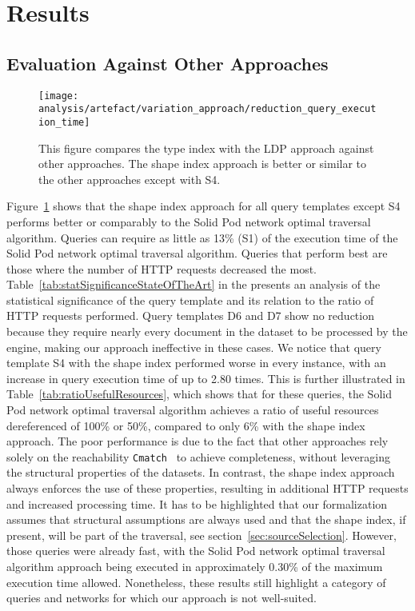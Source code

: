 \section{Results}

\subsection{Evaluation Against Other Approaches}

\begin{figure}[h]
    \centering
    \texttt{[image: analysis/artefact/variation\_approach/reduction\_query\_execution\_time]}
    \caption{
        This figure compares the type index with the LDP approach against other approaches.
        The shape index approach is better or similar to the other approaches except with S4.
    }
    \label{fig:compApproach}
\end{figure}


Figure~\ref{fig:compApproach} shows that the shape index approach for all query templates except S4 performs better or comparably to the Solid Pod network optimal traversal algorithm.
Queries can require as little as 13\% (S1) of the execution time of the Solid Pod network optimal traversal algorithm.
Queries that perform best are those where the number of HTTP requests decreased the most.
Table~\ref{tab:statSignificanceStateOfTheArt} in the  presents an analysis of the statistical significance of the query template and its relation to the ratio of HTTP requests performed.
Query templates D6 and D7 show no reduction because they require nearly every document in the dataset to be processed by the engine, making our approach ineffective in these cases.
We notice that query template S4 with the shape index performed worse in every instance, with an increase in query execution time of up to 2.80 times.
This is further illustrated in Table~\ref{tab:ratioUsefulResources}, which shows that for these queries, the Solid Pod network optimal traversal algorithm achieves a ratio of useful resources dereferenced of 100\% or 50\%, compared to only 6\% with the shape index approach.
The poor performance is due to the fact that other approaches rely solely on the reachability \texttt{Cmatch}~\cite{hartig2016walking} to achieve completeness, without leveraging the structural properties of the datasets.
In contrast, the shape index approach always enforces the use of these properties, resulting in additional HTTP requests and increased processing time.
It has to be highlighted that our formalization assumes that structural assumptions are always used and that the shape index, if present, will be part of the traversal, see section~\ref{sec:sourceSelection}.
However, those queries were already fast, with the Solid Pod network optimal traversal algorithm approach being executed in approximately 0.30\% of the maximum execution time allowed.
Nonetheless, these results still highlight a category of queries and networks for which our approach is not well-suited.


